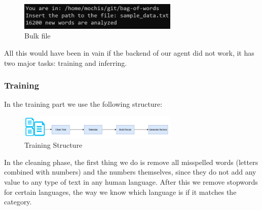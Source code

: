 \documentclass[sigconf,12pt,review=false,natbib=false]{acmart}
\begin{document}
\begin{figure}[h!]
    \centering
    \includegraphics[width=3in]{bulk_file}
    \caption{Bulk file}
    \label{fig:bulk_file}
\end{figure}

All this would have been in vain if the backend of our agent did not work, it has two major tasks: training and inferring. \\

\subsubsection{Training}

In the training part we use the following structure: \\

\begin{figure}[h!]
    \centering
    \includegraphics[width=3in]{structure}
    \caption{Training Structure}
    \label{fig:bulk_file}
\end{figure}

In the cleaning phase, the first thing we do is remove all misspelled words (letters combined with numbers) and the numbers
themselves, since they do not add any value to any type of text in any human language. After this we remove stopwords for
certain languages, the way we know which language is if it matches the category. \\
\end{document}
